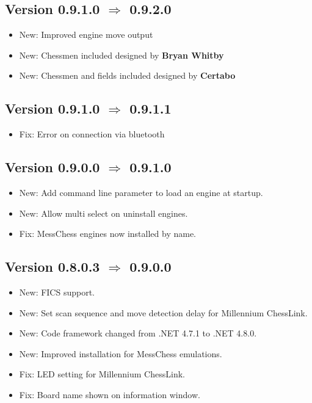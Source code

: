 \documentclass[11pt,a4paper]{article}
\begin{document}
\subsection*{Version 0.9.1.0 $\Rightarrow$  0.9.2.0}
\begin{itemize}
	\item {\color{blue}New}: Improved engine move output
	\item {\color{blue}New}: Chessmen included designed by \textbf{Bryan Whitby}
	\item {\color{blue}New}: Chessmen and fields included designed by \textbf{Certabo}
\end{itemize}

\subsection*{Version 0.9.1.0 $\Rightarrow$  0.9.1.1}
\begin{itemize}
	\item {\color{red}Fix}: Error on connection via bluetooth 
\end{itemize}

\subsection*{Version 0.9.0.0 $\Rightarrow$  0.9.1.0}
\begin{itemize}
	\item {\color{blue}New}: Add command line parameter to load an engine at startup.
	\item {\color{blue}New}: Allow multi select on uninstall engines.
	\item {\color{red}Fix}: MessChess engines now installed by name.
\end{itemize}

\subsection*{Version 0.8.0.3 $\Rightarrow$  0.9.0.0}
\begin{itemize}
	\item {\color{blue}New}: FICS support.
	\item {\color{blue}New}: Set scan sequence and move detection delay for Millennium ChessLink.
	\item {\color{blue}New}: Code framework changed from .NET 4.7.1 to .NET 4.8.0.
	\item {\color{blue}New}: Improved installation for MessChess emulations.
	\item {\color{red}Fix}: LED setting for Millennium ChessLink.
	\item {\color{red}Fix}: Board name shown on information window.	
\end{itemize}
\end{document}
